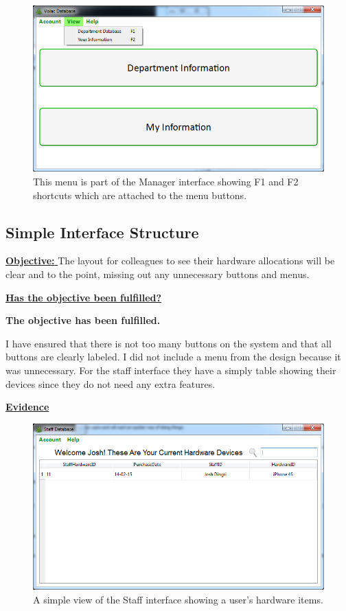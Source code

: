 \begin{figure}[H]
    \includegraphics[width=\textwidth]{./Evaluation/Images/shortcuts2.png}
    \caption{This menu is part of the Manager interface showing F1 and F2 shortcuts which are attached to the menu buttons.} 
\end{figure}


\subsection{Simple Interface Structure}\label{interface}

\underline{\textbf{Objective:} }  The layout for colleagues to see their hardware allocations will be clear and to the point, missing out any unnecessary buttons and menus.

\underline{\textbf{Has the objective been fulfilled?}}

\textbf{The objective has been fulfilled.}

I have ensured that there is not too many buttons on the system and that all buttons are clearly labeled. I did not include a menu from the design because it was unnecessary. For the staff interface they have a simply table showing their devices  since they do not need any extra features. 

\underline{\textbf{Evidence}}

\begin{figure}[H]
    \includegraphics[width=\textwidth]{./Evaluation/Images/staffhardwaredevice.png}
    \caption{A simple view of the Staff interface showing a user's hardware items.} 
\end{figure}

